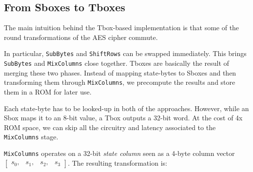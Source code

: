 \subsection{From Sboxes to Tboxes}

The main intuition behind the Tbox-based implementation is that some of the round
transformations of the AES cipher commute.

In particular, \texttt{SubBytes} and \texttt{ShiftRows} can be swapped immediately.
This brings \texttt{SubBytes} and \texttt{MixColumns} close together. Tboxes are
basically the result of merging these two phases. Instead of mapping state-bytes
to Sboxes and then transforming them through \texttt{MixColumns}, we
precompute the results and store them in a ROM for later use.

Each state-byte has to be looked-up in both of the approaches. However, while an Sbox maps
it to an 8-bit value, a Tbox outputs a 32-bit word. At the cost of 4x ROM space, we can skip
all the circuitry and latency associated to the \texttt{MixColumns} stage.

\texttt{MixColumns} operates on a 32-bit \textit{state column} seen as a 4-byte
column vector $\begin{bmatrix} s_{0} , & s_{1} , & s_{2} , & s_{3} \end{bmatrix}$. The resulting transformation is:


